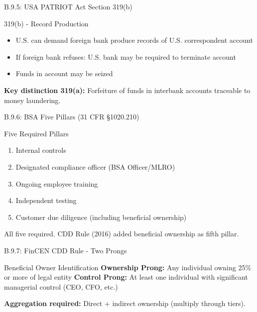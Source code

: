 \documentclass{beamer}
\begin{document}
	\begin{frame}{B.9.5: USA PATRIOT Act Section 319(b)}
		\begin{block}{319(b) - Record Production}
			\begin{itemize}
				\item U.S. can demand foreign bank produce records of U.S. correspondent account
				\item If foreign bank refuses: U.S. bank may be required to terminate account
				\item Funds in account may be seized
			\end{itemize}
		\end{block}
		\textbf{Key distinction 319(a):} Forfeiture of funds in interbank accounts traceable to money laundering.
	\end{frame}
	
	\begin{frame}{B.9.6: BSA Five Pillars (31 CFR §1020.210)}
		\begin{block}{Five Required Pillars}
			\begin{enumerate}
				\item Internal controls
				\item Designated compliance officer (BSA Officer/MLRO)
				\item Ongoing employee training
				\item Independent testing
				\item Customer due diligence (including beneficial ownership)
			\end{enumerate}
		\end{block}
		\textcolor{red}{\textbf{}} All five required. CDD Rule (2016) added beneficial ownership as fifth pillar.
	\end{frame}
	
	\begin{frame}{B.9.7: FinCEN CDD Rule - Two Prongs}
		\begin{block}{Beneficial Owner Identification}
			\textbf{Ownership Prong:} Any individual owning 25\% or more of legal entity
			\vspace{0.2cm}
			\textbf{Control Prong:} At least one individual with significant managerial control (CEO, CFO, etc.)
		\end{block}
		\textbf{Aggregation required:} Direct + indirect ownership (multiply through tiers).
	\end{frame}
	
\end{document}

